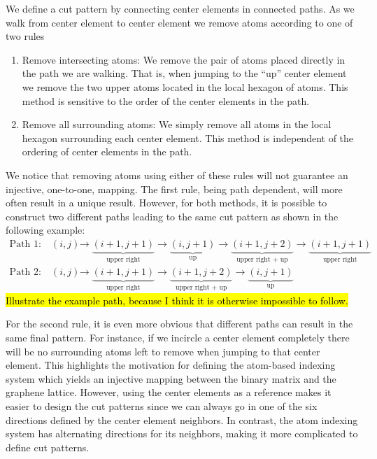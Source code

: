 We define a cut pattern by connecting center elements in connected paths. As
we walk from center element to center element we remove atoms according to one of two rules 
\begin{enumerate}
  \item Remove intersecting atoms: We remove the pair of atoms placed directly
  in the path we are walking. That is, when jumping to the ``up'' center
  element we remove the two upper atoms located in the local hexagon of atoms.
  This method is sensitive to the order of the center elements in the path. 
  \item Remove all surrounding atoms: We simply remove all atoms in the local
  hexagon surrounding each center element. This method is independent of the
  ordering of center elements in the path.
\end{enumerate}
We notice that removing atoms using either of these rules will not guarantee an injective, one-to-one, mapping. The first rule, being path dependent, will more often result in a unique result. However, for both methods, it is possible to construct two different paths leading to the same cut pattern as shown in the following example:
\begin{align*}
  \text{Path 1:} \quad (i, j) &\rightarrow \underbrace{(i+1,j+1)}_{\text{upper right}} \rightarrow \underbrace{(i, j+1)}_{\text{up}} \rightarrow \underbrace{(i+1, j+2)}_{\text{upper right + up}} \rightarrow \underbrace{(i+1, j+1)}_{\text{upper right}} \\
  \text{Path 2:} \quad (i, j) &\rightarrow \underbrace{(i+1,j+1)}_{\text{upper right}} \rightarrow \underbrace{(i+1, j+2)}_{\text{upper right + up}} \rightarrow \underbrace{(i, j+1)}_{\text{up}}
\end{align*}
\hl{Illustrate the example path, because I think it is otherwise impossible to follow.}

For the second rule, it is even more obvious that different paths can result in the same final pattern. For instance, if we incircle a center element completely there will be no surrounding atoms left to remove when jumping to that center element. This highlights the motivation for defining the atom-based indexing system which yields an injective mapping between the binary matrix and the graphene lattice. However, using the center elements as a reference makes it easier to design the cut patterns since we can always go in one of the six directions defined by the center element neighbors. In contrast, the atom indexing system has alternating directions for its neighbors, making it more complicated to define cut patterns.
 

